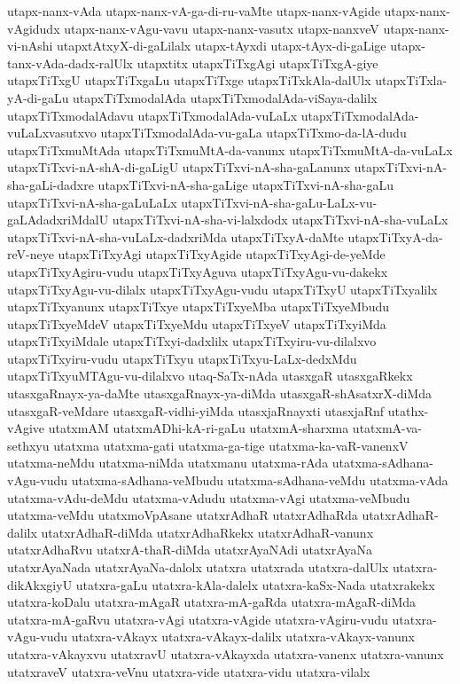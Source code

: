 {utapx-nanx-vAda
utapx-nanx-vA-ga-di-ru-vaMte
utapx-nanx-vAgide
utapx-nanx-vAgidudx
utapx-nanx-vAgu-vavu
utapx-nanx-vasutx
utapx-nanxveV
utapx-nanx-vi-nAshi
utapxtAtxyX-di-gaLilalx
utapx-tAyxdi
utapx-tAyx-di-gaLige
utapx-tanx-vAda-dadx-ralUlx
utapxtitx
utapxTiTxgAgi
utapxTiTxgA-giye
utapxTiTxgU
utapxTiTxgaLu
utapxTiTxge
utapxTiTxkAla-dalUlx
utapxTiTxla-yA-di-gaLu
utapxTiTxmodalAda
utapxTiTxmodalAda-viSaya-dalilx
utapxTiTxmodalAdavu
utapxTiTxmodalAda-vuLaLx
utapxTiTxmodalAda-vuLaLxvasutxvo
utapxTiTxmodalAda-vu-gaLa
utapxTiTxmo-da-lA-dudu
utapxTiTxmuMtAda
utapxTiTxmuMtA-da-vanunx
utapxTiTxmuMtA-da-vuLaLx
utapxTiTxvi-nA-shA-di-gaLigU
utapxTiTxvi-nA-sha-gaLanunx
utapxTiTxvi-nA-sha-gaLi-dadxre
utapxTiTxvi-nA-sha-gaLige
utapxTiTxvi-nA-sha-gaLu
utapxTiTxvi-nA-sha-gaLuLaLx
utapxTiTxvi-nA-sha-gaLu-LaLx-vu-gaLAdadxriMdalU
utapxTiTxvi-nA-sha-vi-lalxdodx
utapxTiTxvi-nA-sha-vuLaLx
utapxTiTxvi-nA-sha-vuLaLx-dadxriMda
utapxTiTxyA-daMte
utapxTiTxyA-da-reV-neye
utapxTiTxyAgi
utapxTiTxyAgide
utapxTiTxyAgi-de-yeMde
utapxTiTxyAgiru-vudu
utapxTiTxyAguva
utapxTiTxyAgu-vu-dakekx
utapxTiTxyAgu-vu-dilalx
utapxTiTxyAgu-vudu
utapxTiTxyU
utapxTiTxyalilx
utapxTiTxyanunx
utapxTiTxye
utapxTiTxyeMba
utapxTiTxyeMbudu
utapxTiTxyeMdeV
utapxTiTxyeMdu
utapxTiTxyeV
utapxTiTxyiMda
utapxTiTxyiMdale
utapxTiTxyi-dadxlilx
utapxTiTxyiru-vu-dilalxvo
utapxTiTxyiru-vudu
utapxTiTxyu
utapxTiTxyu-LaLx-dedxMdu
utapxTiTxyuMTAgu-vu-dilalxvo
utaq-SaTx-nAda
utasxgaR
utasxgaRkekx
utasxgaRnayx-ya-daMte
utasxgaRnayx-ya-diMda
utasxgaR-shAsatxrX-diMda
utasxgaR-veMdare
utasxgaR-vidhi-yiMda
utasxjaRnayxti
utasxjaRnf
utathx-vAgive
utatxmAM
utatxmADhi-kA-ri-gaLu
utatxmA-sharxma
utatxmA-va-sethxyu
utatxma
utatxma-gati
utatxma-ga-tige
utatxma-ka-vaR-vanenxV
utatxma-neMdu
utatxma-niMda
utatxmanu
utatxma-rAda
utatxma-sAdhana-vAgu-vudu
utatxma-sAdhana-veMbudu
utatxma-sAdhana-veMdu
utatxma-vAda
utatxma-vAdu-deMdu
utatxma-vAdudu
utatxma-vAgi
utatxma-veMbudu
utatxma-veMdu
utatxmoVpAsane
utatxrAdhaR
utatxrAdhaRda
utatxrAdhaR-dalilx
utatxrAdhaR-diMda
utatxrAdhaRkekx
utatxrAdhaR-vanunx
utatxrAdhaRvu
utatxrA-thaR-diMda
utatxrAyaNAdi
utatxrAyaNa
utatxrAyaNada
utatxrAyaNa-dalolx
utatxra
utatxrada
utatxra-dalUlx
utatxra-dikAkxgiyU
utatxra-gaLu
utatxra-kAla-dalelx
utatxra-kaSx-Nada
utatxrakekx
utatxra-koDalu
utatxra-mAgaR
utatxra-mA-gaRda
utatxra-mAgaR-diMda
utatxra-mA-gaRvu
utatxra-vAgi
utatxra-vAgide
utatxra-vAgiru-vudu
utatxra-vAgu-vudu
utatxra-vAkayx
utatxra-vAkayx-dalilx
utatxra-vAkayx-vanunx
utatxra-vAkayxvu
utatxravU
utatxra-vAkayxda
utatxra-vanenx
utatxra-vanunx
utatxraveV
utatxra-veVnu
utatxra-vide
utatxra-vidu
utatxra-vilalx
}
